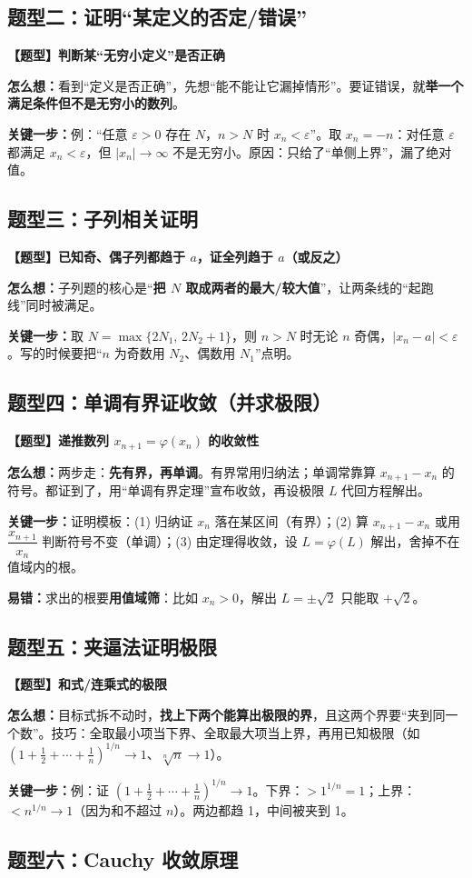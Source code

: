 ﻿\documentclass[11pt,a4paper,UTF8]{ctexart}
\newcommand{\eps}{\varepsilon}
\newcommand{\thm}[1]{\par\smallskip\noindent\colorbox{blue!8}{\textbf{【题型】#1}}\par\smallskip}
\newcommand{\think}[1]{\par\smallskip\noindent\textcolor{purple!75!black}{\textbf{怎么想：}#1}\par\smallskip}
\newcommand{\key}[1]{\par\smallskip\noindent\colorbox{yellow!22}{\textbf{关键一步：}#1}\par\smallskip}
\newcommand{\pit}[1]{\par\smallskip\noindent\textcolor{red!70!black}{\textbf{易错：}#1}\par\smallskip}
\begin{document}
\subsection{题型二：证明“某定义的否定/错误”}

\thm{判断某“无穷小定义”是否正确}
\think{看到“定义是否正确”，先想“能不能让它漏掉情形”。要证错误，就\textbf{举一个满足条件但不是无穷小的数列}。}
\key{例：“任意 $\eps>0$ 存在 $N$，$n>N$ 时 $x_n<\eps$”。取 $x_n=-n$：对任意 $\eps$ 都满足 $x_n<\eps$，但 $|x_n|\to\infty$ 不是无穷小。原因：只给了“单侧上界”，漏了绝对值。}

\subsection{题型三：子列相关证明}

\thm{已知奇、偶子列都趋于 $a$，证全列趋于 $a$（或反之）}
\think{子列题的核心是“\textbf{把 $N$ 取成两者的最大/较大值}”，让两条线的“起跑线”同时被满足。}
\key{取 $N=\max\{2N_1,\,2N_2+1\}$，则 $n>N$ 时无论 $n$ 奇偶，$|x_n-a|<\eps$。写的时候要把“$n$ 为奇数用 $N_2$、偶数用 $N_1$”点明。}

\subsection{题型四：单调有界证收敛（并求极限）}

\thm{递推数列 $x_{n+1}=\varphi(x_n)$ 的收敛性}
\think{两步走：\textbf{先有界，再单调}。有界常用归纳法；单调常靠算 $x_{n+1}-x_n$ 的符号。都证到了，用“单调有界定理”宣布收敛，再设极限 $L$ 代回方程解出。}
\key{证明模板：(1) 归纳证 $x_n$ 落在某区间（有界）；(2) 算 $x_{n+1}-x_n$ 或用 $\dfrac{x_{n+1}}{x_n}$ 判断符号不变（单调）；(3) 由定理得收敛，设 $L=\varphi(L)$ 解出，舍掉不在值域内的根。}
\pit{求出的根要\textbf{用值域筛}：比如 $x_n>0$，解出 $L=\pm\sqrt2$ 只能取 $+\sqrt2$。}

\subsection{题型五：夹逼法证明极限}

\thm{和式/连乘式的极限}
\think{目标式拆不动时，\textbf{找上下两个能算出极限的界}，且这两个界要“夹到同一个数”。技巧：全取最小项当下界、全取最大项当上界，再用已知极限（如 $(1+\frac12+\cdots+\frac1n)^{1/n}\to1$、$\sqrt[n]n\to1$）。}
\key{例：证 $\left(1+\frac12+\cdots+\frac1n\right)^{1/n}\to1$。下界：$>1^{1/n}=1$；上界：$<n^{1/n}\to1$（因为和不超过 $n$）。两边都趋 1，中间被夹到 1。}

\subsection{题型六：Cauchy 收敛原理}
\end{document}
